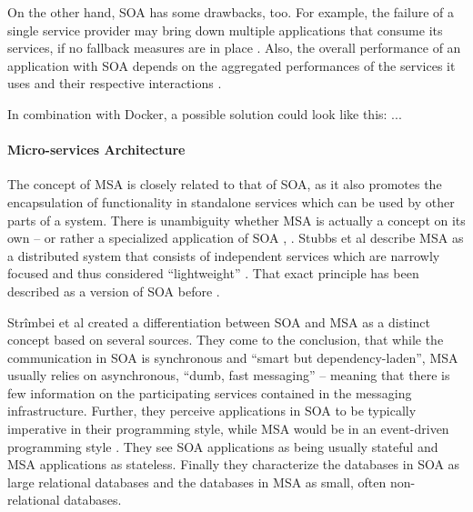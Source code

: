     On the other hand, \ac{SOA} has some drawbacks, too.
    For example, the failure of a single service provider may bring down multiple applications that consume its services, if no fallback measures are in place \cite[p.~408f]{Papazoglou2007Service}.
    Also, the overall performance of an application with \ac{SOA} depends on the aggregated performances of the services it uses and their respective interactions \cite[p.~408f]{Papazoglou2007Service}.

    In combination with Docker, a possible solution could look like this: ...

  \paragraph{Micro-services Architecture} %
    \label{par:micro_services_architecture}
    The concept of \ac{MSA} is closely related to that of \ac{SOA}, as it also promotes the encapsulation of functionality in standalone services which can be used by other parts of a system. There is unambiguity whether \ac{MSA} is actually a concept on its own -- or rather a specialized application of \ac{SOA} \cite[p.~35]{Stubbs2015Distributed}, \cite[p.~17]{Strimbei2015Software}.
    Stubbs et al describe \ac{MSA} as a distributed system that consists of independent services which are   narrowly focused and thus considered ``lightweight'' \cite[p.~35]{Stubbs2015Distributed}.
    That exact principle has been described as a version of \ac{SOA} before \cite[p.~395]{Papazoglou2007Service}.

    Strîmbei et al created a differentiation between SOA and MSA as a distinct concept based on several sources. They come to the conclusion, that while the communication in \ac{SOA} is synchronous and ``smart but dependency-laden'', \ac{MSA} usually relies on asynchronous, ``dumb, fast messaging'' -- meaning that there is few information on the participating services contained in the messaging infrastructure. Further, they perceive applications in \ac{SOA} to be typically imperative in their programming style, while \ac{MSA} would be in an event-driven programming style \cite[pp.~17-20]{Strimbei2015Software}. They see \ac{SOA} applications as being usually stateful and \ac{MSA} applications as stateless. Finally they characterize the databases in \ac{SOA} as large relational databases and the databases in \ac{MSA} as small, often non-relational databases.

